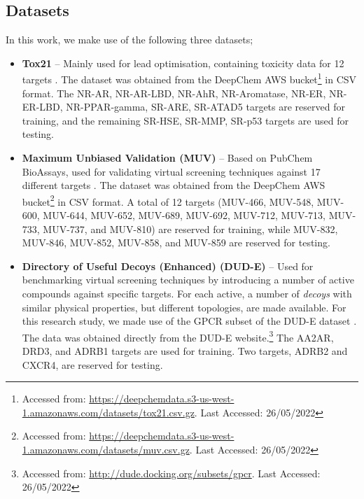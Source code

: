 \subsection{Datasets}

In this work, we make use of the following three datasets;

\begin{itemize}
    
    \item \textbf{Tox21} \citep{huang2016tox21challenge} -- Mainly used for lead optimisation, containing toxicity data for 12 targets \citep{tox21}. The dataset was obtained from the DeepChem AWS bucket\footnote{Accessed from: \url{https://deepchemdata.s3-us-west-1.amazonaws.com/datasets/tox21.csv.gz}. Last Accessed: 26/05/2022} in CSV format. The NR-AR, NR-AR-LBD, NR-AhR, NR-Aromatase, NR-ER, NR-ER-LBD, NR-PPAR-gamma, SR-ARE, SR-ATAD5 targets are reserved for training, and the remaining SR-HSE, SR-MMP, SR-p53 targets are used for testing.
    
    \item \textbf{Maximum Unbiased Validation (MUV)} \citep{rohrer2009maximum} -- Based on PubChem BioAssays, used for validating virtual screening techniques against 17 different targets \citep{rohrer2009maximum}. The dataset was obtained from the DeepChem AWS bucket\footnote{Accessed from: \url{https://deepchemdata.s3-us-west-1.amazonaws.com/datasets/muv.csv.gz}. Last Accessed: 26/05/2022} in CSV format. A total of 12 targets (MUV-466, MUV-548, MUV-600, MUV-644, MUV-652, MUV-689, MUV-692, MUV-712, MUV-713, MUV-733, MUV-737, and MUV-810) are reserved for training, while MUV-832, MUV-846, MUV-852, MUV-858, and MUV-859 are reserved for testing.
    
    \item \textbf{Directory of Useful Decoys (Enhanced) (DUD-E)} \cite{mysinger2012directory} -- Used for benchmarking virtual screening techniques by introducing a number of active compounds against specific targets. For each active, a number of \textit{decoys} with similar physical properties, but different topologies, are made available. For this research study, we made use of the GPCR subset of the DUD-E dataset \citep{mysinger2012directory}. The data was obtained directly from the DUD-E website.\footnote{Accessed from: \url{http://dude.docking.org/subsets/gpcr}. Last Accessed: 26/05/2022} The AA2AR, DRD3, and ADRB1 targets are used for training. Two targets, ADRB2 and CXCR4, are reserved for testing.
\end{itemize}

